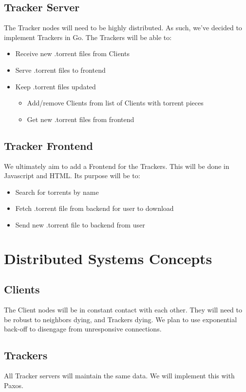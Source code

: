 \documentclass[11pt]{article}
\begin{document}
\subsection*{Tracker Server}
The Tracker nodes will need to be highly distributed.
As such, we've decided to implement Trackers in Go.
The Trackers will be able to:
\begin{itemize}
\item  Receive new .torrent files from Clients
\item  Serve .torrent files to frontend
\item  Keep .torrent files updated
    \begin{itemize}
    \item  Add/remove Clients from list of Clients with torrent pieces
    \item  Get new .torrent files from frontend
    \end{itemize}
\end{itemize}

\subsection*{Tracker Frontend}
We ultimately aim to add a Frontend for the Trackers.
This will be done in Javascript and HTML.
Its purpose will be to:
\begin{itemize}
\item  Search for torrents by name
\item  Fetch .torrent file from backend for user to download
\item  Send new .torrent file to backend from user
\end{itemize}

\section*{Distributed Systems Concepts}

\subsection*{Clients}
The Client nodes will be in constant contact with each other.
They will need to be robust to neighbors dying, and Trackers dying.
We plan to use exponential back-off to disengage from unresponsive connections.

\subsection*{Trackers}
All Tracker servers will maintain the same data.
We will implement this with Paxos.
\end{document}
